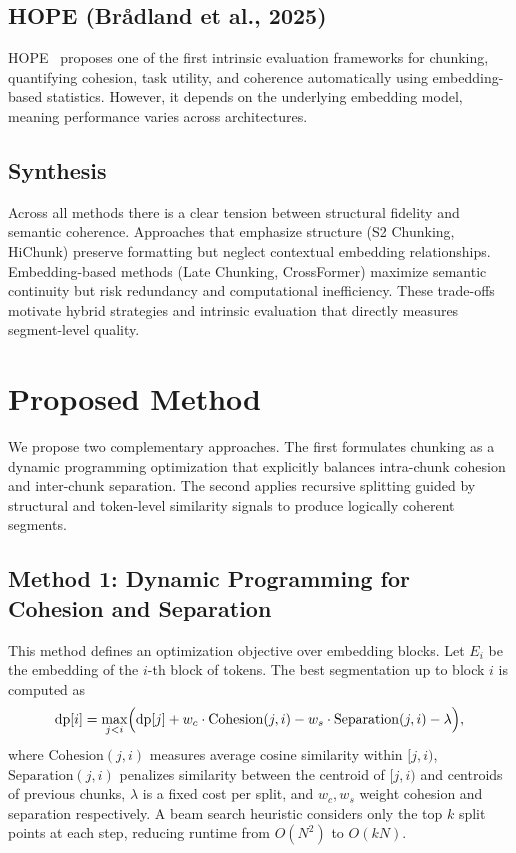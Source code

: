\documentclass[conference]{IEEEtran}
\begin{document}
\subsection{HOPE (Br{\aa}dland et al., 2025)}
HOPE~\cite{bradland2025hope} proposes one of the first intrinsic evaluation
frameworks for chunking, quantifying cohesion, task utility, and coherence
automatically using embedding-based statistics. However, it depends on the
underlying embedding model, meaning performance varies across architectures.

\subsection{Synthesis}
Across all methods there is a clear tension between structural fidelity and
semantic coherence. Approaches that emphasize structure (S2 Chunking,
HiChunk) preserve formatting but neglect contextual embedding relationships.
Embedding-based methods (Late Chunking, CrossFormer) maximize semantic
continuity but risk redundancy and computational inefficiency. These
trade-offs motivate hybrid strategies and intrinsic evaluation that directly
measures segment-level quality.

\section{Proposed Method}

We propose two complementary approaches. The first formulates chunking as
a dynamic programming optimization that explicitly balances intra-chunk
cohesion and inter-chunk separation. The second applies recursive splitting
guided by structural and token-level similarity signals to produce logically
coherent segments.

\subsection{Method 1: Dynamic Programming for Cohesion and Separation}

This method defines an optimization objective over embedding blocks. Let
$E_i$ be the embedding of the $i$-th block of tokens. The best segmentation
up to block $i$ is computed as
\begin{equation}
\mathrm{dp}[i] = \max_{j < i} \Bigl(\mathrm{dp}[j] + w_c \cdot
\mathrm{Cohesion}(j, i) - w_s \cdot \mathrm{Separation}(j, i) - \lambda
\Bigr),
\end{equation}
where $\mathrm{Cohesion}(j, i)$ measures average cosine similarity within
$[j, i)$, $\mathrm{Separation}(j, i)$ penalizes similarity between the
centroid of $[j, i)$ and centroids of previous chunks, $\lambda$ is a fixed
cost per split, and $w_c, w_s$ weight cohesion and separation respectively.
A beam search heuristic considers only the top $k$ split points at each
step, reducing runtime from $O(N^2)$ to $O(kN)$.
\end{document}
